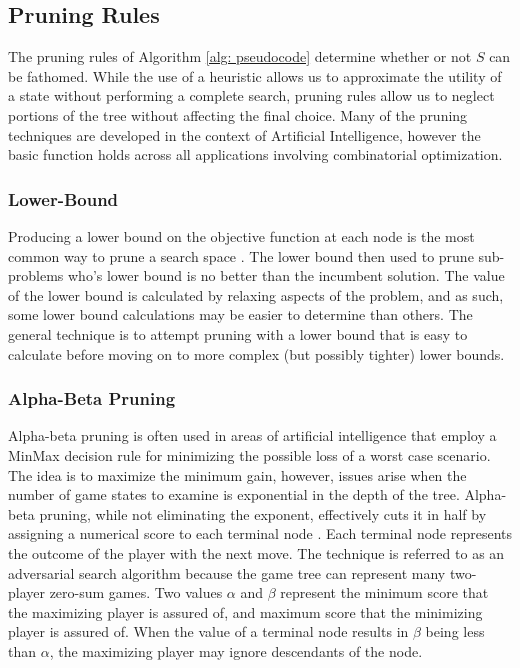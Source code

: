 
\subsection{Pruning Rules}
	The pruning rules of Algorithm \ref{alg: pseudocode} determine whether or not $S$ can be fathomed.
	While the use of a heuristic allows us to approximate the utility of a state without performing a complete search, pruning rules allow us to neglect portions of the tree without affecting the final choice. 
	Many of the pruning techniques are developed in the context of Artificial Intelligence, however the basic function holds across all applications involving combinatorial optimization. 
	\subsubsection{Lower-Bound}
		Producing a lower bound on the objective function at each node is the most common way to prune a search space \cite{morrison2016branch}. 
		The lower bound then used to prune sub-problems who's lower bound is no better than the incumbent solution. 
		The value of the lower bound is calculated by relaxing aspects of the problem, and as such, some lower bound calculations may be easier to determine than others. 
		The general technique is to attempt pruning with a lower bound that is easy to calculate before moving on to more complex (but possibly tighter) lower bounds. 
	\subsubsection{Alpha-Beta Pruning}
		Alpha-beta pruning is often used in areas of artificial intelligence that employ a MinMax decision rule for minimizing the possible loss of a worst case scenario. 
		The idea is to maximize the minimum gain, however, issues arise when the number of game states to examine is exponential in the depth of the tree. 
		Alpha-beta pruning, while not eliminating the exponent, effectively cuts it in half by assigning a numerical score to each terminal node \cite{russell2010artificial}. 
		Each terminal node represents the outcome of the player with the next move.
		The technique is referred to as an adversarial search algorithm because the game tree can represent many two-player zero-sum games. 
		Two values $\alpha$ and $\beta$ represent the minimum score that the maximizing player is assured of, and maximum score that the minimizing player is assured of. 
		When the value of a terminal node results in $\beta$ being less than $\alpha$, the maximizing player may ignore descendants of the node.  
